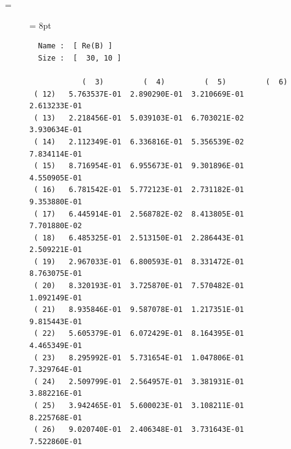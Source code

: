 \documentclass{jbook}
\makeatletter
\let\realnormalsize=\normalsize
\def\preveqno{}\let\real@float=\@float \let\realend@float=\end@float
\def\@float{\let\@savefreelist\@freelist\real@float}
\def\end@float{\realend@float\global\let\@freelist\@savefreelist}
\def\adjustnormalsize{\def\normalsize{\mathsurround=0pt \realnormalsize
 \parindent=0pt\abovedisplayskip=0pt\belowdisplayskip=0pt}\normalsize}%
\def\lthtmltypeout#1{{\let\protect\string\immediate\write\lthtmlwrite{#1}}}%
\newcommand\lthtmlvboxmathA{\adjustnormalsize\setbox\sizebox=\vbox\bgroup%
 \let\ifinner=\iffalse }%
\newcommand\lthtmlboxmathZ{\@next\next\@currlist{}{\def\next{\voidb@x}}%
 \expandafter\box\next\egroup}%
\newcommand\lthtmlmathtype[1]{\def\lthtmlmathenv{#1}}%
\newcommand\lthtmllogmath{\lthtmltypeout{l2hSize %
:\lthtmlmathenv:\the\ht\sizebox::\the\dp\sizebox::\the\wd\sizebox.\preveqno}}%
\newcommand\lthtmlfigureA[1]{\let\@savefreelist\@freelist
       \lthtmlmathtype{#1}\lthtmlvboxmathA}%
\newcommand\lthtmlfigureZ{\lthtmlboxmathZ\lthtmllogmath\copy\sizebox
       \global\let\@freelist\@savefreelist}%
\def\lthtmlcheckvsize{\ifdim\ht\sizebox<\vsize\expandafter\vfill
  \else\expandafter\vss\fi}%
\makeatother
\begin{document}
{\newpage\clearpage
\lthtmlfigureA{figure3439}%
\begin{figure}
\begin{center}\htmlrule\small
{\baselineskip = 8pt
\begin{tex2html_preform}\begin{verbatim}  Name :  [ Re(B) ]
  Size :  [  30, 10 ]

            (  3)         (  4)         (  5)         (  6)
 ( 12)   5.763537E-01  2.890290E-01  3.210669E-01  2.613233E-01
 ( 13)   2.218456E-01  5.039103E-01  6.703021E-02  3.930634E-01
 ( 14)   2.112349E-01  6.336816E-01  5.356539E-02  7.834114E-01
 ( 15)   8.716954E-01  6.955673E-01  9.301896E-01  4.550905E-01
 ( 16)   6.781542E-01  5.772123E-01  2.731182E-01  9.353880E-01
 ( 17)   6.445914E-01  2.568782E-02  8.413805E-01  7.701880E-02
 ( 18)   6.485325E-01  2.513150E-01  2.286443E-01  2.509221E-01
 ( 19)   2.967033E-01  6.800593E-01  8.331472E-01  8.763075E-01
 ( 20)   8.320193E-01  3.725870E-01  7.570482E-01  1.092149E-01
 ( 21)   8.935846E-01  9.587078E-01  1.217351E-01  9.815443E-01
 ( 22)   5.605379E-01  6.072429E-01  8.164395E-01  4.465349E-01
 ( 23)   8.295992E-01  5.731654E-01  1.047806E-01  7.329764E-01
 ( 24)   2.509799E-01  2.564957E-01  3.381931E-01  3.882216E-01
 ( 25)   3.942465E-01  5.600023E-01  3.108211E-01  8.225768E-01
 ( 26)   9.020740E-01  2.406348E-01  3.731643E-01  7.522860E-01\end{verbatim}\end{tex2html_preform}}\htmlrule\end{center}
\vspace{-1em}
\par\end{figure}%
\lthtmlfigureZ
\hfill\lthtmlcheckvsize\clearpage}
\end{document}
